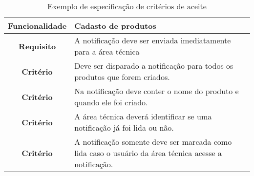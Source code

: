     \begin{table}[h!]
      \centering
      \begin{tabular}{|c|p{10cm}|}
        \hline
        \textbf{Funcionalidade} &
        Cadasto de produtos \\ \hline
        \textbf{Requisito} &
        A notificação deve ser enviada imediatamente para a área técnica \\ \hline
        \textbf{Critério} &
        Deve ser disparado a notificação para todos os produtos que forem criados. \\ \hline
        \textbf{Critério} &
        Na notificação deve conter o nome do produto e quando ele foi criado. \\ \hline
        \textbf{Critério} &
        A área técnica deverá identificar se uma notificação já foi lida ou não. \\ \hline
        \textbf{Critério} &
        A notificação somente deve ser marcada como lida caso o usuário da área
        técnica acesse a notificação. \\ \hline
      \end{tabular}
      \caption{Exemplo de especificação de critérios de aceite}
      \label{Tabela:8}
    \end{table}


